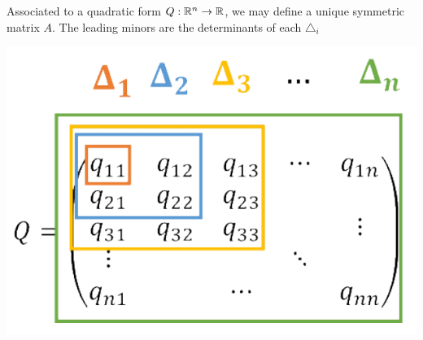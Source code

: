 Associated to a quadratic form $Q : \mathbb{R}^n\to\mathbb{R}$, we may define a unique symmetric matrix $A$.
The leading minors are the determinants of each $\triangle_i$
\begin{center}
    \includegraphics[scale=0.5]{Images/26.png}
\end{center}
